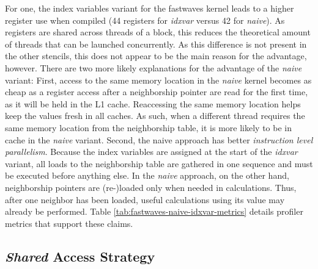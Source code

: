 For one, the index variables variant for the fastwaves kernel leads to a higher register use when compiled (44 registers for \emph{idxvar} versus 42 for \emph{naive}). As registers are shared across threads of a block, this reduces the theoretical amount of threads that can be launched concurrently. As this difference is not present in the other stencils, this does not appear to be the main reason for the advantage, however. There are two more likely explanations for the advantage of the \emph{naive} variant: First, access to the same memory location in the \emph{naive} kernel becomes as cheap as a register access after a neighborship pointer are read for the first time, as it will be held in the L1 cache. Reaccessing the same memory location helps keep the values fresh in all caches. As such, when a different thread requires the same memory location from the neighborship table, it is more likely to be in cache in the \emph{naive} variant. Second, the naive approach has better \emph{instruction level parallelism}. Because the index variables are assigned at the start of the \emph{idxvar} variant, all loads to the neighborship table are gathered in one sequence and must be executed before anything else. In the \emph{naive} approach, on the other hand, neighborship pointers are (re-)loaded only when needed in calculations. Thus, after one neighbor has been loaded, useful calculations using its value may already be performed. Table \ref{tab:fastwaves-naive-idxvar-metrics} details profiler metrics that support these claims.


\subsection{\emph{Shared} Access Strategy}

